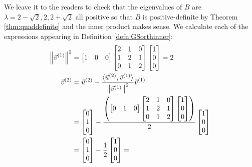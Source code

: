 \begin{solution}
We leave it to the readers to check that the eigenvalues of $B$ are $\lambda = 2-\sqrt{2},2,2+\sqrt{2}$ all positive so that $B$ is positive-definite by Theorem \ref{thm:quaddefinite} and the inner product makes sense. We calculate each of the expressions appearing in Definition \ref{defn:GSorthinner}:
\begin{align*}
\norm{\vec{v}^{(1)}}^2 &= 
\begin{bmatrix}
1 & 0 & 0
\end{bmatrix}
\begin{bmatrix}
2&1&0\\ 
1&2&1\\
0&1&2
\end{bmatrix}
\begin{bmatrix}
1 \\
0 \\
0
\end{bmatrix} = 2 \\
\vec{v}^{(2)} &= \vec{u}^{(2)} - \frac{\langle \vec{u}^{(2)}, \vec{v}^{(1)}\rangle}{\norm{\vec{v}^{(1)}}^2} \vec{v}^{(1)} \\
&= \begin{bmatrix}
0 \\
1 \\
0
\end{bmatrix}
-
\frac{\left(\begin{bmatrix}
0 & 1 & 0
\end{bmatrix}
\begin{bmatrix}
2&1&0\\ 
1&2&1\\
0&1&2
\end{bmatrix}
\begin{bmatrix}
1 \\
0 \\
0
\end{bmatrix}\right)}{2}
\begin{bmatrix}
1 \\
0 \\
0
\end{bmatrix} \\
&= \begin{bmatrix}
0 \\
1 \\
0
\end{bmatrix}
-\frac{1}{2}
\begin{bmatrix}
1 \\
0 \\
0
\end{bmatrix} =

\end{align*}
\end{solution}
